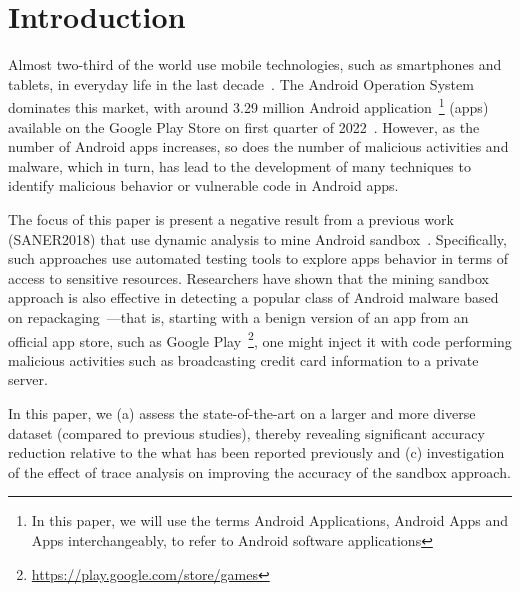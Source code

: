 \section{Introduction}\label{sec:introduction}

Almost two-third of the world use mobile technologies, such as smartphones and tablets, in everyday life in the last decade~\cite{Comscore,DBLP:journals/tse/MartinSJZH17}. 
The Android Operation System dominates this market, with around 3.29 
million Android application~\footnote{In this paper, we will use the terms Android Applications, Android Apps and Apps interchangeably, to refer to Android software applications} (apps) available on the Google Play Store on first quarter of 2022~\cite{Statista}. 
However, as the number of Android apps increases, so does the number of malicious activities and 
malware, which in turn, has lead to the development of many techniques
to identify malicious behavior or vulnerable code in Android apps.

The focus of this paper is present a negative result from a
%
previous work (SANER2018) that use dynamic analysis to mine Android sandbox~\cite{DBLP:conf/icse/JamrozikSZ16}. 
Specifically, such approaches use automated testing tools 
to explore apps behavior in terms of access to sensitive resources. Researchers have shown that the mining sandbox approach is also effective in detecting a popular class of Android malware based on repackaging~\cite{DBLP:conf/wcre/BaoLL18,le2018towards}---that is, starting with a benign version of an app from an official app store, such as Google Play~\footnote{\url{https://play.google.com/store/games}}, one might inject it with code performing malicious activities such as broadcasting credit card information to a private server.~\cite{DBLP:journals/tse/LiBK21} %

In this paper, we (a) assess the state-of-the-art on a larger and more diverse dataset (compared to previous studies),
thereby revealing significant accuracy reduction relative to the what has been reported previously and
(c) investigation of the effect of trace analysis on improving the accuracy of the sandbox approach.

